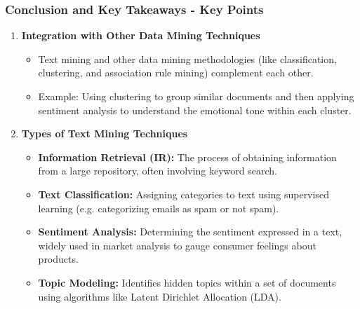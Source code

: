 \documentclass[aspectratio=169]{beamer}
\begin{document}
\begin{frame}[fragile]
    \frametitle{Conclusion and Key Takeaways - Key Points}
    
    \begin{enumerate}
        \item \textbf{Integration with Other Data Mining Techniques}  
        \begin{itemize}
            \item Text mining and other data mining methodologies (like classification, clustering, and association rule mining) complement each other.
            \item Example: Using clustering to group similar documents and then applying sentiment analysis to understand the emotional tone within each cluster.
        \end{itemize}

        \item \textbf{Types of Text Mining Techniques}  
        \begin{itemize}
            \item \textbf{Information Retrieval (IR):} The process of obtaining information from a large repository, often involving keyword search.
            \item \textbf{Text Classification:} Assigning categories to text using supervised learning (e.g. categorizing emails as spam or not spam).
            \item \textbf{Sentiment Analysis:} Determining the sentiment expressed in a text, widely used in market analysis to gauge consumer feelings about products.
            \item \textbf{Topic Modeling:} Identifies hidden topics within a set of documents using algorithms like Latent Dirichlet Allocation (LDA).
        \end{itemize}
    \end{enumerate}
\end{frame}
\end{document}
